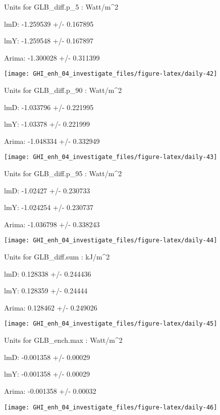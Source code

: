 \documentclass[
  10pt,
  a4paper,oneside]{article}
\begin{document}
Units for GLB\_diff.p\_5 : Watt/m\^{}2

lmD: -1.259539 +/- 0.167895

lmY: -1.259548 +/- 0.167897

Arima: -1.300028 +/- 0.311399

\begin{center}\texttt{[image: GHI\_enh\_04\_investigate\_files/figure-latex/daily-42]} \end{center}

Units for GLB\_diff.p\_90 : Watt/m\^{}2

lmD: -1.033796 +/- 0.221995

lmY: -1.03378 +/- 0.221999

Arima: -1.048334 +/- 0.332949

\begin{center}\texttt{[image: GHI\_enh\_04\_investigate\_files/figure-latex/daily-43]} \end{center}

Units for GLB\_diff.p\_95 : Watt/m\^{}2

lmD: -1.02427 +/- 0.230733

lmY: -1.024254 +/- 0.230737

Arima: -1.036798 +/- 0.338243

\begin{center}\texttt{[image: GHI\_enh\_04\_investigate\_files/figure-latex/daily-44]} \end{center}

Units for GLB\_diff.sum : kJ/m\^{}2

lmD: 0.128338 +/- 0.244436

lmY: 0.128359 +/- 0.24444

Arima: 0.128462 +/- 0.249026

\begin{center}\texttt{[image: GHI\_enh\_04\_investigate\_files/figure-latex/daily-45]} \end{center}

Units for GLB\_ench.max : Watt/m\^{}2

lmD: -0.001358 +/- 0.00029

lmY: -0.001358 +/- 0.00029

Arima: -0.001358 +/- 0.00032

\begin{center}\texttt{[image: GHI\_enh\_04\_investigate\_files/figure-latex/daily-46]} \end{center}
\end{document}
